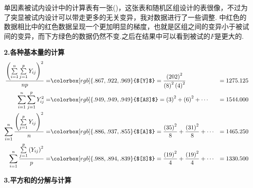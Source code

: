 单因素被试内设计中的计算表有一张()，这张表和随机区组设计的表很像，不过为了突显被试内设计可以带走更多的无关变异，我对数据进行了一些调整.
中红色的数据相比中的红色数据呈现一个更加明显的梯度，也就是区组之间的变异小于被试间的变异，而下方绿色的数据仍然不变.之后在结果中可以看到被试的$F$是更大的.

\textbf{2.各种基本量的计算}
    \begin{align*}
            \frac{
                \left(
        	\sum\limits_{i=1}^{n} \sum\limits_{j=1}^{p}Y_{ij}
                \right)^2}
            {np}=& \colorbox[rgb]{ .867,  .922,  .969}{$[Y]$} = 
            \frac{
                \left(
        	    202
                \right)^2}
                {
                    \left(
        	           8
                    \right)^2
                    \left(
                        4
                    \right)^2
                }&=1275.125\\
            \sum\limits_{i=1}^{n} \sum\limits_{j=1}^{p}Y_{ij}^2=
            & \colorbox[rgb]{ .949,  .949,  .949}{$[AS]$} = 
            \left(
            	3
            \right)^2 +
            \left(
            	6
            \right)^2    +\cdots &=1544.000\\
            \sum\limits_{i=1}^{n}
            \frac
                {\left(
	            \sum\limits_{j=1}^{p}Y_{ij}
                \right)^2}
                {n}=
            &\colorbox[rgb]{ .886,  .937,  .855}{$[A]$}=
            \frac{\left(35\right)^2}{8}+\frac{\left(31\right)^2}{8}+\cdots&=1465.250\\
            \sum\limits_{i=1}^{n}
            \frac
            {
                \sum\limits_{j=1}^{p}\left(Y_{ij} \right)^2
            }
            {
                p            
            }            
            =&\colorbox[rgb]{ .988,  .894,  .839}{$[S]$}
            =\frac{\left( 19 \right)^2}{4} + \frac{\left( 19 \right)^2}{4} + \cdots &= 1330.500
    \end{align*}
    
\textbf{3.平方和的分解与计算}

